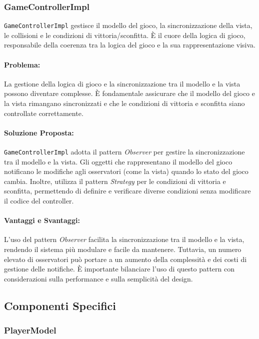 \documentclass[a4paper,12pt]{report}
\begin{document}
\subsubsection{GameControllerImpl}

\texttt{GameControllerImpl} gestisce il modello del gioco, la sincronizzazione della vista, le collisioni e le condizioni di vittoria/sconfitta. È il cuore della logica di gioco, responsabile della coerenza tra la logica del gioco e la sua rappresentazione visiva.

\paragraph{Problema:} La gestione della logica di gioco e la sincronizzazione tra il modello e la vista possono diventare complesse. È fondamentale assicurare che il modello del gioco e la vista rimangano sincronizzati e che le condizioni di vittoria e sconfitta siano controllate correttamente.

\paragraph{Soluzione Proposta:} \texttt{GameControllerImpl} adotta il pattern \textit{Observer} per gestire la sincronizzazione tra il modello e la vista. Gli oggetti che rappresentano il modello del gioco notificano le modifiche agli osservatori (come la vista) quando lo stato del gioco cambia. Inoltre, utilizza il pattern \textit{Strategy} per le condizioni di vittoria e sconfitta, permettendo di definire e verificare diverse condizioni senza modificare il codice del controller.

\paragraph{Vantaggi e Svantaggi:} 
L'uso del pattern \textit{Observer} facilita la sincronizzazione tra il modello e la vista, rendendo il sistema più modulare e facile da mantenere. Tuttavia, un numero elevato di osservatori può portare a un aumento della complessità e dei costi di gestione delle notifiche. È importante bilanciare l'uso di questo pattern con considerazioni sulla performance e sulla semplicità del design.

\subsection{Componenti Specifici}

\subsubsection{PlayerModel}
\end{document}
